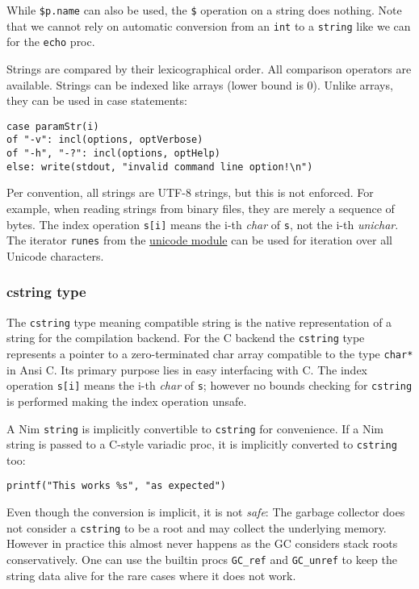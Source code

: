 While \texttt{\$p.name} can also be used, the \texttt{\$} operation on a
string does nothing. Note that we cannot rely on automatic conversion
from an \texttt{int} to a \texttt{string} like we can for the
\texttt{echo} proc.

Strings are compared by their lexicographical order. All comparison
operators are available. Strings can be indexed like arrays (lower bound
is 0). Unlike arrays, they can be used in case statements:

\begin{verbatim}
case paramStr(i)
of "-v": incl(options, optVerbose)
of "-h", "-?": incl(options, optHelp)
else: write(stdout, "invalid command line option!\n")
\end{verbatim}

Per convention, all strings are UTF-8 strings, but this is not enforced.
For example, when reading strings from binary files, they are merely a
sequence of bytes. The index operation \texttt{s{[}i{]}} means the i-th
\emph{char} of \texttt{s}, not the i-th \emph{unichar}. The iterator
\texttt{runes} from the \href{unicode.html}{unicode module} can be used
for iteration over all Unicode characters.

\hypertarget{cstring-type}{%
\subsubsection{cstring type}\label{cstring-type}}

The \texttt{cstring} type meaning {compatible string} is the native
representation of a string for the compilation backend. For the C
backend the \texttt{cstring} type represents a pointer to a
zero-terminated char array compatible to the type \texttt{char*} in Ansi
C. Its primary purpose lies in easy interfacing with C. The index
operation \texttt{s{[}i{]}} means the i-th \emph{char} of \texttt{s};
however no bounds checking for \texttt{cstring} is performed making the
index operation unsafe.

A Nim \texttt{string} is implicitly convertible to \texttt{cstring} for
convenience. If a Nim string is passed to a C-style variadic proc, it is
implicitly converted to \texttt{cstring} too:

\begin{verbatim}
printf("This works %s", "as expected")
\end{verbatim}

Even though the conversion is implicit, it is not \emph{safe}: The
garbage collector does not consider a \texttt{cstring} to be a root and
may collect the underlying memory. However in practice this almost never
happens as the GC considers stack roots conservatively. One can use the
builtin procs \texttt{GC\_ref} and \texttt{GC\_unref} to keep the string
data alive for the rare cases where it does not work.

